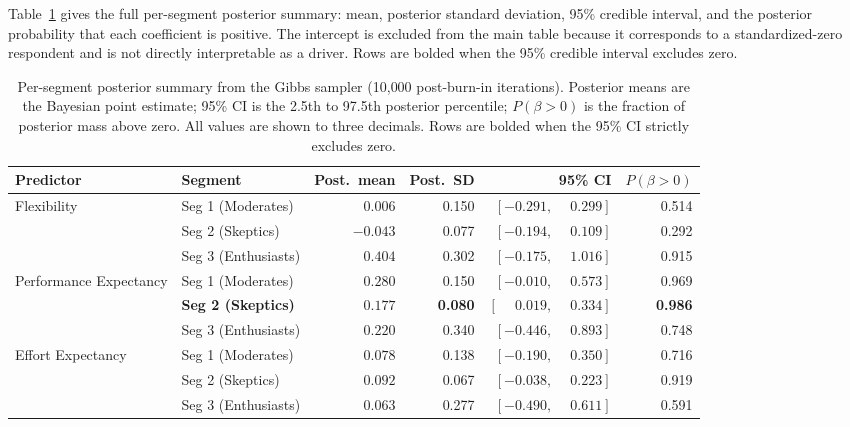 \documentclass[11pt]{article}
\begin{document}
Table~\ref{tab:posterior} gives the full per-segment posterior
summary: mean, posterior standard deviation, 95\% credible
interval, and the posterior probability that each coefficient is
positive. The intercept is excluded from the main table because it
corresponds to a standardized-zero respondent and is not directly
interpretable as a driver. Rows are bolded when the 95\% credible
interval excludes zero.

\begin{table}[H]
  \centering
  \caption{Per-segment posterior summary from the Gibbs sampler
           (10{,}000 post-burn-in iterations). Posterior means are
           the Bayesian point estimate; 95\% CI is the 2.5th to
           97.5th posterior percentile; $P(\beta > 0)$ is the
           fraction of posterior mass above zero. All values are
           shown to three decimals. Rows are bolded when the 95\%
           CI strictly excludes zero.}
  \label{tab:posterior}
  \small
  \begin{tabular}{l l r r r r}
    \toprule
    Predictor & Segment & Post.\ mean & Post.\ SD & 95\% CI & $P(\beta > 0)$ \\
    \midrule
    \multirow{3}{*}{Flexibility}
      & Seg 1 (Moderates)   & $\phantom{-}0.006$ & 0.150 & $[-0.291, \phantom{-}0.299]$ & 0.514 \\
      & Seg 2 (Skeptics)    & $-0.043$           & 0.077 & $[-0.194, \phantom{-}0.109]$ & 0.292 \\
      & Seg 3 (Enthusiasts) & $\phantom{-}0.404$ & 0.302 & $[-0.175, \phantom{-}1.016]$ & 0.915 \\
    \midrule
    \multirow{3}{*}{Performance Expectancy}
      & Seg 1 (Moderates)            & $\phantom{-}0.280$           & 0.150          & $[-0.010, \phantom{-}0.573]$           & 0.969 \\
      & \textbf{Seg 2 (Skeptics)}    & $\mathbf{\phantom{-}0.177}$  & \textbf{0.080} & $\mathbf{[\phantom{-}0.019, \phantom{-}0.334]}$ & \textbf{0.986} \\
      & Seg 3 (Enthusiasts)          & $\phantom{-}0.220$           & 0.340          & $[-0.446, \phantom{-}0.893]$           & 0.748 \\
    \midrule
    \multirow{3}{*}{Effort Expectancy}
      & Seg 1 (Moderates)   & $\phantom{-}0.078$ & 0.138 & $[-0.190, \phantom{-}0.350]$ & 0.716 \\
      & Seg 2 (Skeptics)    & $\phantom{-}0.092$ & 0.067 & $[-0.038, \phantom{-}0.223]$ & 0.919 \\
      & Seg 3 (Enthusiasts) & $\phantom{-}0.063$ & 0.277 & $[-0.490, \phantom{-}0.611]$ & 0.591 \\

\end{tabular}
\end{table}
\end{document}

